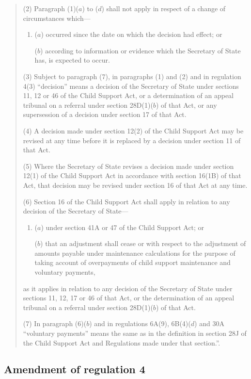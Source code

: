 \documentclass[12pt,a4paper]{article}
\begin{document}
\begin{quotation}
(2) Paragraph (1)($a$)  to ($d$)  shall not apply in respect of a change of circumstances which—
\begin{enumerate}\item[]
($a$) occurred since the date on which the decision had effect; or

($b$) according to information or evidence which the Secretary of State has, is expected to occur.
\end{enumerate}

(3) Subject to paragraph (7), in paragraphs (1) and (2) and in regulation 4(3) “decision” means a decision of the Secretary of State under sections 11, 12 or 46 of the Child Support Act, or a determination of an appeal tribunal on a referral under section 28D(1)($b$)  of that Act, or any supersession of a decision under section 17 of that Act.

(4) A decision made under section 12(2) of the Child Support Act may be revised at any time before it is replaced by a decision under section 11 of that Act.

(5) Where the Secretary of State revises a decision made under section 12(1) of the Child Support Act in accordance with section 16(1B) of that Act, that decision may be revised under section 16 of that Act at any time.

(6) Section 16 of the Child Support Act shall apply in relation to any decision of the Secretary of State—
\begin{enumerate}\item[]
($a$) under section 41A or 47 of the Child Support Act; or

($b$) that an adjustment shall cease or with respect to the adjustment of amounts payable under maintenance calculations for the purpose of taking account of overpayments of child support maintenance and voluntary payments,
\end{enumerate}
as it applies in relation to any decision of the Secretary of State under sections 11, 12, 17 or 46 of that Act, or the determination of an appeal tribunal on a referral under section 28D(1)($b$)  of that Act.

(7) In paragraph (6)($b$)  and in regulations 6A(9), 6B(4)($d$)  and 30A “voluntary payments” means the same as in the definition in section 28J of the Child Support Act and Regulations made under that section.”.
\end{quotation}

\subsection[6. Amendment of regulation 4]{Amendment of regulation 4}
\end{document}
